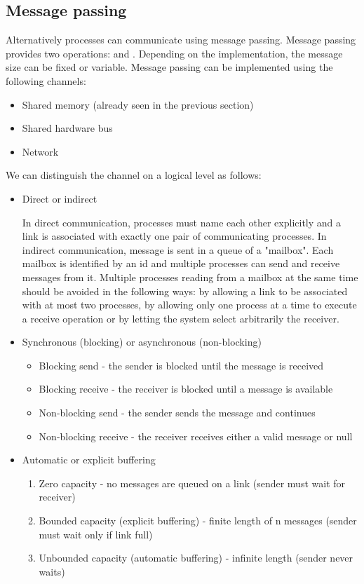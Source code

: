 \subsection{Message passing}
Alternatively processes can communicate using message passing. Message passing provides two operations:  and . Depending on the implementation, the message size can be fixed or variable. Message passing can be implemented using the following channels:
\begin{itemize}
  \item Shared memory (already seen in the previous section)
  \item Shared hardware bus
  \item Network
\end{itemize}
We can distinguish the channel on a logical level as follows:
\begin{itemize}
  \item Direct or indirect
  
  In direct communication, processes must name each other explicitly and a link is associated with exactly one pair of communicating processes. 
  In indirect communication, message is sent in a queue of a "mailbox". Each mailbox is identified by an id and multiple processes can send and receive messages from it. Multiple processes reading from a mailbox at the same time should be avoided in the following ways: by allowing a link to be associated with at most two processes, by allowing only one process at a time to execute a receive operation or by letting the system select arbitrarily the receiver.
  \item Synchronous (blocking) or asynchronous (non-blocking)
  
  \begin{itemize}
    \item Blocking send - the sender is blocked until the message is
    received
    \item Blocking receive - the receiver is blocked until a message is
    available
    \item Non-blocking send - the sender sends the message and
    continues
    \item Non-blocking receive - the receiver receives either a valid message or null
  \end{itemize}
  
  \item Automatic or explicit buffering
  
  \begin{enumerate}
    \item Zero capacity - no messages are queued on a link (sender must wait for receiver)
    \item Bounded capacity (explicit buffering) - finite length of n messages (sender must wait only if link full)
    \item Unbounded capacity (automatic buffering) - infinite length (sender never waits)
  \end{enumerate}
\end{itemize}

